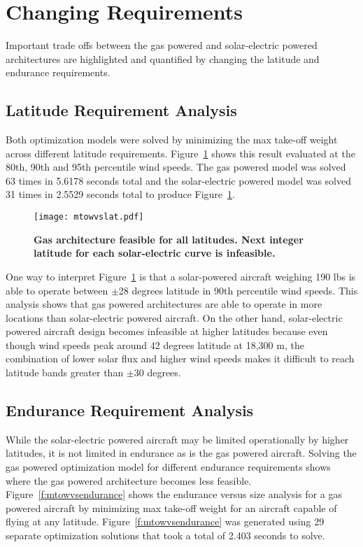 


\normalsize

\section{Changing Requirements}

Important trade offs between the gas powered and solar-electric powered architectures are highlighted and quantified by changing the latitude and endurance requirements.   

\subsection{Latitude Requirement Analysis}

Both optimization models were solved by minimizing the max take-off weight across different latitude requirements. 
Figure~\ref{f:latvsmtowtrade} shows this result evaluated at the 80th, 90th and 95th percentile wind speeds.  
The gas powered model was solved 63 times in 5.6178 seconds total and the solar-electric powered model was solved 31 times in 2.5529 seconds total to produce Figure~\ref{f:latvsmtowtrade}.

\begin{figure}[h!]
	\begin{center}
	\texttt{[image: mtowvslat.pdf]}
    \caption{\textbf{Gas architecture feasible for all latitudes. Next integer latitude for each solar-electric curve is infeasible.}}
    \label{f:latvsmtowtrade}
	\end{center}
\end{figure}

One way to interpret Figure~\ref{f:latvsmtowtrade} is that a solar-powered aircraft weighing 190 lbs is able to operate between $\pm$28 degrees latitude in 90th percentile wind speeds.  
This analysis shows that gas powered architectures are able to operate in more locations than solar-electric powered aircraft.  
On the other hand, solar-electric powered aircraft design becomes infeasible at higher latitudes because even though wind speeds peak around 42 degrees latitude at 18,300 m, the combination of lower solar flux and higher wind speeds makes it difficult to reach latitude bands greater than $\pm$30 degrees. 

\subsection{Endurance Requirement Analysis}
While the solar-electric powered aircraft may be limited operationally by higher latitudes, it is not limited in endurance as is the gas powered aircraft.
Solving the gas powered optimization model for different endurance requirements shows where the gas powered architecture becomes less feasible. 
Figure~\ref{f:mtowvsendurance} shows the endurance versus size analysis for a gas powered aircraft by minimizing max take-off weight for an aircraft capable of flying at any latitude. 
Figure~\ref{f:mtowvsendurance} was generated using 29 separate optimization solutions that took a total of 2.403 seconds to solve.

